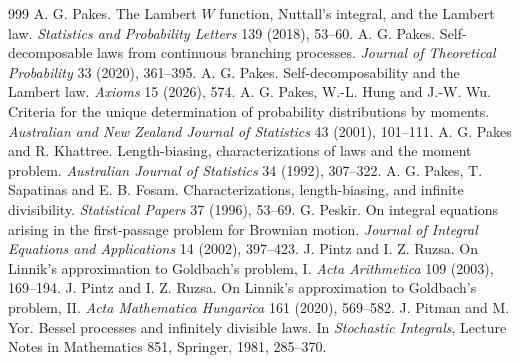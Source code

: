 \begin{thebibliography}{999}
 A. G. Pakes. The Lambert $W$ function, Nuttall's integral, and the Lambert law. \emph{Statistics and Probability Letters} 139 (2018), 53--60.
 A. G. Pakes. Self-decomposable laws from continuous branching processes. \emph{Journal of Theoretical Probability} 33 (2020), 361--395.
 A. G. Pakes. Self-decomposability and the Lambert law. \emph{Axioms} 15 (2026), 574.
 A. G. Pakes, W.-L. Hung and J.-W. Wu. Criteria for the unique determination of probability distributions by moments. \emph{Australian and New Zealand Journal of Statistics} 43 (2001), 101--111.
 A. G. Pakes and R. Khattree. Length-biasing, characterizations of laws and the moment problem. \emph{Australian Journal of Statistics} 34 (1992), 307--322.
 A. G. Pakes, T. Sapatinas and E. B. Fosam. Characterizations, length-biasing, and infinite divisibility. \emph{Statistical Papers} 37 (1996), 53--69.
 G. Peskir. On integral equations arising in the first-passage problem for Brownian motion. \emph{Journal of Integral Equations and Applications} 14 (2002), 397--423.
 J. Pintz and I. Z. Ruzsa. On Linnik's approximation to Goldbach's problem, I. \emph{Acta Arithmetica} 109 (2003), 169--194.
 J. Pintz and I. Z. Ruzsa. On Linnik's approximation to Goldbach's problem, II. \emph{Acta Mathematica Hungarica} 161 (2020), 569--582.
 J. Pitman and M. Yor. Bessel processes and infinitely divisible laws. In \emph{Stochastic Integrals}, Lecture Notes in Mathematics 851, Springer, 1981, 285--370.

\end{thebibliography}
